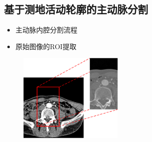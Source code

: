 \subsection[主动脉分割]{基于测地活动轮廓的主动脉分割}

\begin{frame}
\begin{itemize}
\item 主动脉内腔分割流程
\end{itemize}
\begin{figure}[t]
\centering

\end{figure}
\end{frame}

\begin{frame}
\begin{itemize}
\item 原始图像的ROI提取
\end{itemize}
\begin{figure}[t]
\centering
\includegraphics[width=2.0in]{../../Figures/gac/ROI.eps}
\end{figure}
\end{frame}

